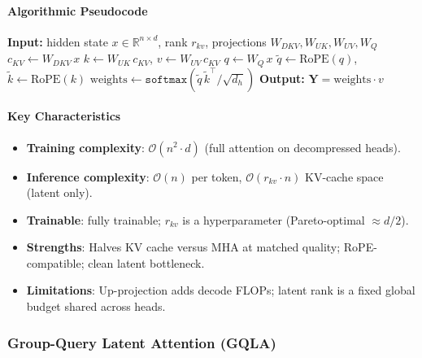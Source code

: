 \paragraph{Algorithmic Pseudocode}
\begin{algorithmic}[1]
\State \textbf{Input:} hidden state $x \in \mathbb{R}^{n \times d}$, rank $r_{kv}$, projections $W_{DKV}, W_{UK}, W_{UV}, W_{Q}$
\State $c_{KV} \gets W_{DKV}\, x$ 
\State $k \gets W_{UK}\, c_{KV}$, \quad $v \gets W_{UV}\, c_{KV}$ 
\State $q \gets W_{Q}\, x$
\State $\tilde q \gets \text{RoPE}(q)$, \quad $\tilde k \gets \text{RoPE}(k)$ 
\State $\text{weights} \gets \texttt{softmax}(\tilde q\, \tilde k^\top / \sqrt{d_h})$
\State \textbf{Output:} $\mathbf{Y} = \text{weights} \cdot v$
\end{algorithmic}

\paragraph{Key Characteristics}
\begin{itemize}[leftmargin=*]
    \item \textbf{Training complexity}: $\mathcal{O}(n^2 \cdot d)$ (full attention on decompressed heads).
    \item \textbf{Inference complexity}: $\mathcal{O}(n)$ per token, $\mathcal{O}(r_{kv} \cdot n)$ KV-cache space (latent only).
    \item \textbf{Trainable}: fully trainable; $r_{kv}$ is a hyperparameter (Pareto-optimal $\approx d/2$).
    \item \textbf{Strengths}: Halves KV cache versus MHA at matched quality; RoPE-compatible; clean latent bottleneck.
    \item \textbf{Limitations}: Up-projection adds decode FLOPs; latent rank is a fixed global budget shared across heads.
\end{itemize}

\subsubsection{Group-Query Latent Attention (GQLA)}


